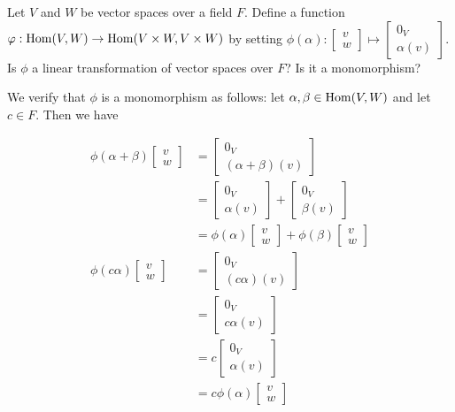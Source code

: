 \begin{problem}[Golan 256]
Let $V$ and $W$ be vector spaces over a field $F$.
Define a function $\varphi : \operatorname{Hom}(V, W) \rightarrow \operatorname{Hom}(V\times W, V\times W)$
by setting
$\phi(\alpha): 
\begin{bmatrix} v\\ w \end{bmatrix} 
\mapsto 
\begin{bmatrix} 0_V\\ \alpha(v) \end{bmatrix}$.
Is $\phi$ a linear transformation of vector spaces over $F$? Is it a monomorphism?
\end{problem}
\smallskip
\begin{solution}
We verify that $\phi$ is a monomorphism as follows: let $\alpha,\beta\in \operatorname{Hom}(V,W)$ and let $c\in F$.  Then we have

\begin{align*}
\phi(\alpha + \beta)\begin{bmatrix}v\\w\end{bmatrix} 
    &= \begin{bmatrix}0_V\\(\alpha + \beta)(v)\end{bmatrix}\\
    &= \begin{bmatrix}0_V\\\alpha(v)\end{bmatrix} + \begin{bmatrix}0_V\\\beta(v)\end{bmatrix}\\
    &= \phi(\alpha)\begin{bmatrix}v\\w\end{bmatrix} + \phi(\beta)\begin{bmatrix}v\\w\end{bmatrix}\\[0.3cm]
\phi(c\alpha)\begin{bmatrix}v\\w\end{bmatrix} 
    &= \begin{bmatrix}0_V\\(c\alpha)(v)\end{bmatrix}\\
    &= \begin{bmatrix}0_V\\c\alpha(v)\end{bmatrix}\\
    &= c\begin{bmatrix}0_V\\\alpha(v)\end{bmatrix}\\
    &= c\phi(\alpha)\begin{bmatrix}v\\w\end{bmatrix}
\end{align*}


\end{solution}
